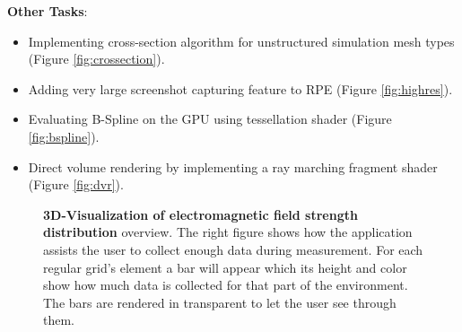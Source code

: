 \documentclass[]{report}
\begin{document}
\hfill

\textbf{Other Tasks}:
\begin{itemize}
	\item Implementing cross-section algorithm for unstructured simulation mesh types (Figure \ref{fig:crossection}).
	\item Adding very large screenshot capturing feature to RPE (Figure \ref{fig:highres}).
	\item Evaluating B-Spline on the GPU using tessellation shader (Figure \ref{fig:bspline}).
	\item Direct volume rendering by implementing a ray marching fragment shader (Figure \ref{fig:dvr}).
\end{itemize}

\begin{figure}[!ht]
	\hfill
	\hfill
	\caption[Factory ray-tracing]{\textbf{3D-Visualization of electromagnetic field strength distribution} overview. The right figure shows how the application assists the user to collect enough data during measurement. For each regular grid's element a bar will appear which its height and color show how much data is collected for that part of the environment. The bars are rendered in transparent to let the user see through them.}
	\label{fig:IDP_overview}
\end{figure}
\end{document}
